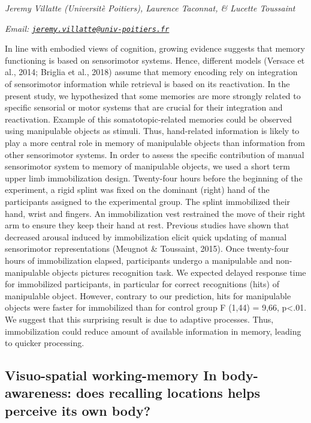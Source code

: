 \documentclass[12pt,]{book}
\begin{document}
\emph{Jeremy Villatte (Universitè Poitiers), Laurence Taconnat, \& Lucette Toussaint}

\emph{Email: \href{mailto:jeremy.villatte@univ-poitiers.fr}{\nolinkurl{jeremy.villatte@univ-poitiers.fr}}}

In line with embodied views of cognition, growing evidence suggests that memory functioning is based on sensorimotor systems. Hence, different models (Versace et al., 2014; Briglia et al., 2018) assume that memory encoding rely on integration of sensorimotor information while retrieval is based on its reactivation. In the present study, we hypothesized that some memories are more strongly related to specific sensorial or motor systems that are crucial for their integration and reactivation. Example of this somatotopic-related memories could be observed using manipulable objects as stimuli. Thus, hand-related information is likely to play a more central role in memory of manipulable objects than information from other sensorimotor systems. In order to assess the specific contribution of manual sensorimotor system to memory of manipulable objects, we used a short term upper limb immobilization design. Twenty-four hours before the beginning of the experiment, a rigid splint was fixed on the dominant (right) hand of the participants assigned to the experimental group. The splint immobilized their hand, wrist and fingers. An immobilization vest restrained the move of their right arm to ensure they keep their hand at rest. Previous studies have shown that decreased arousal induced by immobilization elicit quick updating of manual sensorimotor representations (Meugnot \& Toussaint, 2015). Once twenty-four hours of immobilization elapsed, participants undergo a manipulable and non-manipulable objects pictures recognition task. We expected delayed response time for immobilized participants, in particular for correct recognitions (hits) of manipulable object. However, contrary to our prediction, hits for manipulable objects were faster for immobilized than for control group F (1,44) = 9,66, p\textless{}.01. We suggest that this surprising result is due to adaptive processes. Thus, immobilization could reduce amount of available information in memory, leading to quicker processing.

\hypertarget{visuo-spatial-working-memory-in-body-awareness-does-recalling-locations-helps-perceive-its-own-body}{%
\subsection{Visuo-spatial working-memory In body-awareness: does recalling locations helps perceive its own body?}\label{visuo-spatial-working-memory-in-body-awareness-does-recalling-locations-helps-perceive-its-own-body}}
\end{document}
